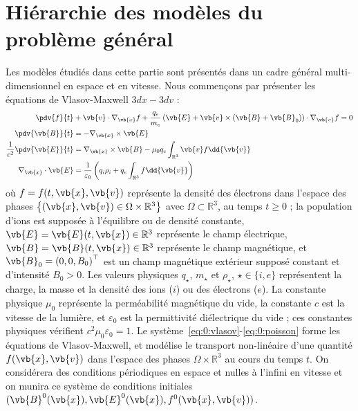 
\section{Hiérarchie des modèles du problème général}
\label{sec:0:model}

Les modèles étudiés dans cette partie sont présentés dans un cadre général multi-dimensionnel en espace et en vitesse. Nous commençons par présenter les équations de Vlasov-Maxwell $3dx-3dv$ :
\begin{align}
  \label{eq:0:vlasov}
    \pdv{f}{t} &+ \vb{v}\cdot\nabla_{\vb{x}} f + \frac{q_e}{m_e}\left( \vb{E} + \vb{v}\times(\vb{B}+\vb{B}_0) \right)\cdot\nabla_{\vb{v}} f = 0 \\
  \label{eq:0:maxwellB}
    \pdv{\vb{B}}{t} &= - \nabla_{\vb{x}}\times\vb{E} \\
  \label{eq:0:maxwellE}
    \frac{1}{c^2}\pdv{\vb{E}}{t} &= \nabla_{\vb{x}}\times \vb{B} - \mu_0 q_e\int_{\mathbb{R}^3} \vb{v} f\dd{\vb{v}} \\
  \label{eq:0:poisson}
    \nabla_{\vb{x}}\cdot\vb{E} &= \frac{1}{\varepsilon_0}\left( q_i\rho_i + q_e\int_{\mathbb{R}^3} f\dd{\vb{v}} \right)
\end{align}
où $f=f(t,\vb{x},\vb{v})$ représente la densité des électrons dans l'espace des phases $\left\{ (\vb{x},\vb{v}) \in \Omega\times\mathbb{R}^3 \right\}$ avec $\Omega\subset\mathbb{R}^3$, au temps $t\geq0$ ; la population d'ions est supposée à l'équilibre ou de densité constante, $\vb{E}=\vb{E}(t,\vb{x})\in\mathbb{R}^3$ représente le champ électrique, $\vb{B}=\vb{B}(t,\vb{x})\in\mathbb{R}^3$ représente le champ magnétique, et $\vb{B}_0 = \left(0,0,B_0\right)^\top$ est un champ magnétique extérieur supposé constant et d'intensité $B_0 > 0$. Les valeurs physiques $q_\star$, $m_\star$ et $\rho_\star$, $\star\in\{i,e\}$ représentent la charge, la masse et la densité des ions ($i$) ou des électrons ($e$). La constante physique $\mu_0$ représente la perméabilité magnétique du vide, la constante $c$ est la vitesse de la lumière, et $\varepsilon_0$ est la permittivité diélectrique du vide ; ces constantes physiques vérifient $c^2\mu_0\varepsilon_0=1$. Le système~\eqref{eq:0:vlasov}-\eqref{eq:0:poisson} forme les équations de Vlasov-Maxwell, et modélise le transport non-linéaire d'une quantité $f(\vb{x},\vb{v})$ dans l'espace des phases $\Omega\times\mathbb{R}^3$ au cours du temps $t$. On considérera des conditions périodiques en espace et nulles à l'infini en vitesse et on munira ce système de conditions initiales $(\vb{B}^0(\vb{x}),\vb{E}^0(\vb{x}),f^0(\vb{x},\vb{v}))$.

